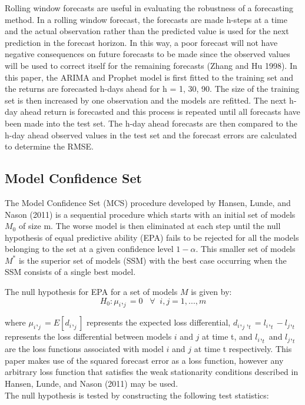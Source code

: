 \documentclass[12pt,a4paper]{article}
\numberwithin{equation}{section}
\numberwithin{figure}{section}
\numberwithin{table}{section}
\begin{document}
Rolling window forecasts are useful in evaluating the robustness of a
forecasting method. In a rolling window forecast, the forecasts are made
h-steps at a time and the actual observation rather than the predicted
value is used for the next prediction in the forecast horizon. In this
way, a poor forecast will not have negative consequences on future
forecasts to be made since the observed values will be used to correct
itself for the remaining forecasts (Zhang and Hu 1998). In this paper,
the ARIMA and Prophet model is first fitted to the training set and the
returns are forecasted h-days ahead for h = 1, 30, 90. The size of the
training set is then increased by one observation and the models are
refitted. The next h-day ahead return is forecasted and this process is
repeated until all forecasts have been made into the test set. The h-day
ahead forecasts are then compared to the h-day ahead observed values in
the test set and the forecast errors are calculated to determine the
RMSE.

\subsection{Model Confidence Set}\label{model-confidence-set}

The Model Confidence Set (MCS) procedure developed by Hansen, Lunde, and
Nason (2011) is a sequential procedure which starts with an initial set
of models \(M_0\) of size m. The worse model is then eliminated at each
step until the null hypothesis of equal predictive ability (EPA) fails
to be rejected for all the models belonging to the set at a given
confidence level \(1 - \alpha\). This smaller set of models \(M^*\) is
the superior set of models (SSM) with the best case occurring when the
SSM consists of a single best model.

The null hypothesis for EPA for a set of models \(M\) is given by:
\[H_0: \mu_i,_j = 0 \;\;\; \forall \;\; i,j = 1,...,m\]

where \(\mu_i,_j = E[d_i,_j]\) represents the expected loss
differential, \(d_i,_j,_t = l_i,_t - l_j,_t\) represents the loss
differential between models \(i\) and \(j\) at time t, and \(l_i,_t\)
and \(l_j,_t\) are the loss functions associated with model \(i\) and
\(j\) at time t respectively. This paper makes use of the squared
forecast error as a loss function, however any arbitrary loss function
that satisfies the weak stationarity conditions described in Hansen,
Lunde, and Nason (2011) may be used.\\
The null hypothesis is tested by constructing the following test
statistics:
\end{document}
